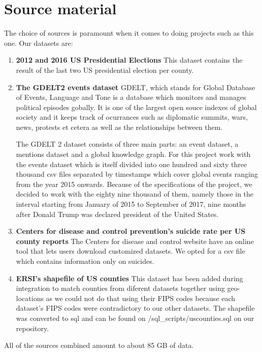 \section{Source material}

The choice of sources is paramount when it comes to doing projects
such as this one. Our datasets are:
\begin{enumerate}
	\item \textbf{2012 and 2016 US Presidential Elections} \cite{kaggle-website}
		This dataset contains the result of the last two US presidential
		election per county.

	\item \textbf{The GDELT2 events dataset} \cite{gdelt-website}
		GDELT, which stands for Global Database of Events, Language
		and Tone is a database which monitors and manages
		political episodes gobally. It is one of the largest
		open souce indexes of global society
		and it keeps track of ocurrances
		such as diplomatic summits, wars, news, protests et
		cetera as well as the relationships between them.


		The GDELT 2 dataset consists of three main parts: an
		event dataset, a mentions dataset and a global knowledge
		graph. For this project work with the events dataset
		which is itself divided into one hundred and sixty three
		thousand csv files separated by timestamps which cover
		global events ranging from the year 2015 onwards.
		Because of the specifications of the project, we decided
		to work with the eighty nine thousand of them, namely
		those in the interval starting from January of 2015 to
		September of 2017, nine months after Donald Trump
		was declared president of the United States.


	\item \textbf{Centers for disease and control prevention's
		suicide rate per US county reports}\cite{suicide-website}
		The Centers for disease and control website have an online
		tool that lets users download customized datasets.
		We opted for a csv file which contains information only
		on suicides.

	\item \textbf{ERSI's shapefile of US counties}\cite{esri-website}
		This dataset has been added during integration to
		match counties from diferent datasets together
		using geo-locations
		as we could not do that using
		their FIPS codes because each dataset's FIPS codes
		were contradictory to our other datasets.
		The shapefile was converted to sql and can be found
		on /sql\_scripts/uscounties.sql on our repository.


\end{enumerate}
All of the sources combined amount to about 85 GB of data.


